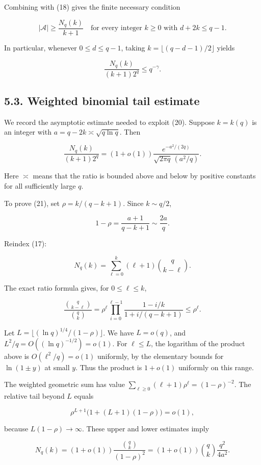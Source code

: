 \documentclass[
  10pt,
]{article}
\begin{document}
Combining with (18) gives the finite necessary condition

\[
 \boxed{
 |\mathcal A|\ge \frac{N_q(k)}{k+1}
 \quad\text{for every integer }k\ge0\text{ with }d+2k\le q-1.
 }\tag{19}
\]

In particular, whenever \(0\le d\le q-1\), taking \(k=\lfloor(q-d-1)/2\rfloor\) yields

\[
 \frac{N_q(k)}{(k+1)2^q}\le q^{-\gamma}.\tag{20}
\]

\subsection{5.3. Weighted binomial tail estimate}\label{weighted-binomial-tail-estimate}

We record the asymptotic estimate needed to exploit (20). Suppose \(k=k(q)\) is an integer with \(a=q-2k\asymp\sqrt{q\ln q}\). Then

\[
 \boxed{
 \frac{N_q(k)}{(k+1)2^q}
 =(1+o(1))\frac{e^{-a^2/(2q)}}{\sqrt{2\pi q}\,(a^2/q)}.
 }\tag{21}
\]

Here \(\asymp\) means that the ratio is bounded above and below by positive constants for all sufficiently large \(q\).

To prove (21), set \(\rho=k/(q-k+1)\). Since \(k\sim q/2\),

\[
 1-\rho=\frac{a+1}{q-k+1}\sim\frac{2a}{q}.
\]

Reindex (17):

\[
 N_q(k)=\sum_{\ell=0}^k(\ell+1)\binom q{k-\ell}.
\]

The exact ratio formula gives, for \(0\le\ell\le k\),

\[
 \frac{\binom q{k-\ell}}{\binom qk}
 =\rho^\ell\prod_{i=0}^{\ell-1}
      \frac{1-i/k}{1+i/(q-k+1)}\le \rho^\ell.
\]

Let \(L=\lfloor(\ln q)^{1/4}/(1-\rho)\rfloor\). We have \(L=o(q)\), and \(L^2/q=O((\ln q)^{-1/2})=o(1)\). For \(\ell\le L\), the logarithm of the product above is \(O(\ell^2/q)=o(1)\) uniformly, by the elementary bounds for \(\ln(1\pm y)\) at small \(y\). Thus the product is \(1+o(1)\) uniformly on this range.

The weighted geometric sum has value \(\sum_{\ell\ge0}(\ell+1)\rho^\ell=(1-\rho)^{-2}\). The relative tail beyond \(L\) equals

\[
 \rho^{L+1}\bigl(1+(L+1)(1-\rho)\bigr)=o(1),
\]

because \(L(1-\rho)\to\infty\). These upper and lower estimates imply

\[
 N_q(k)=(1+o(1))\frac{\binom qk}{(1-\rho)^2}
       =(1+o(1))\binom qk\frac{q^2}{4a^2}.\tag{22}
\]
\end{document}
